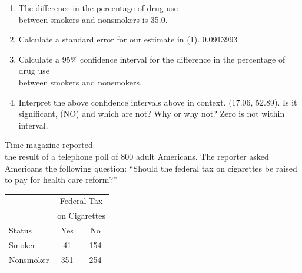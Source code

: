 \documentclass[11pt, chapterprefix=true]{scrbook}\usepackage[]{graphicx}\usepackage[]{color}
\begin{document}
\begin{exercises}
\begin{exercise}
  \end{exercise}
  \begin{solution}  %



\begin{enumerate}
\item The difference in the percentage of drug use \\ between smokers and nonsmokers is 35.0.
\item Calculate a standard error for our estimate in (1).  0.0913993
\item Calculate a 95\% confidence interval for the difference in the percentage of drug use \\ between smokers and nonsmokers.
\item Interpret the above confidence intervals above in context.  (17.06, 52.89). Is it significant, (NO) and which are not? Why or why not? Zero is not within interval.
\end{enumerate}

  \end{solution}

  \begin{exercise} %

Time magazine reported \\ the result of a telephone poll of 800 adult Americans. The reporter asked Americans the following question: ``Should the federal tax on cigarettes be raised to pay for health care reform?''

\begin{table}[ht]
\centering
\begin{tabular}{@{} lcc @{}} \hline
 & \multicolumn{2}{c}{Federal Tax} \\
  & \multicolumn{2}{c}{on Cigarettes} \\
Status & Yes & No \\ \hline
Smoker & 41 & 154 \\
Nonsmoker & 351 & 254 \\ \hline
\end{tabular}
\end{table}


\end{exercise}
\end{exercises}
\end{document}
